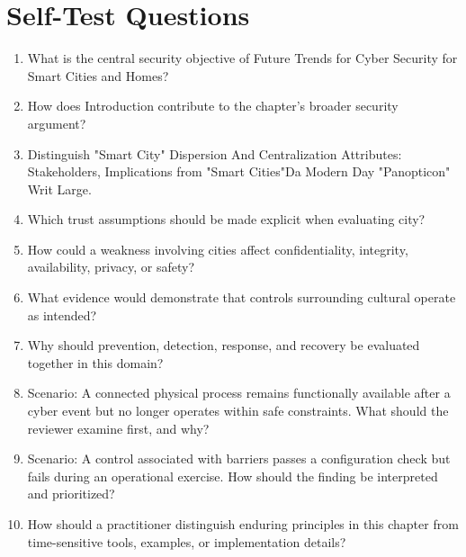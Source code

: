 \documentclass[11pt]{article}
\begin{document}
\section*{Self-Test Questions}
\begin{enumerate}
\item What is the central security objective of Future Trends for Cyber Security for Smart Cities and Homes?
\item How does Introduction contribute to the chapter's broader security argument?
\item Distinguish "Smart City" Dispersion And Centralization Attributes: Stakeholders, Implications from "Smart Cities"Da Modern Day "Panopticon" Writ Large.
\item Which trust assumptions should be made explicit when evaluating city?
\item How could a weakness involving cities affect confidentiality, integrity, availability, privacy, or safety?
\item What evidence would demonstrate that controls surrounding cultural operate as intended?
\item Why should prevention, detection, response, and recovery be evaluated together in this domain?
\item Scenario: A connected physical process remains functionally available after a cyber event but no longer operates within safe constraints. What should the reviewer examine first, and why?
\item Scenario: A control associated with barriers passes a configuration check but fails during an operational exercise. How should the finding be interpreted and prioritized?
\item How should a practitioner distinguish enduring principles in this chapter from time-sensitive tools, examples, or implementation details?
\end{enumerate}
\end{document}
